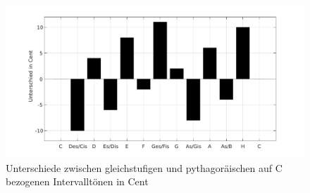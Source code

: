\begin{enumerate}[a)]
\begin{figure}
  \centering
      \includegraphics[width=\textwidth]{Figures/diff}
 \caption{Unterschiede zwischen gleichstufigen und pythagoräischen auf C bezogenen Intervalltönen in Cent}
	\label{fig:f1}
\end{figure}







\end{enumerate}